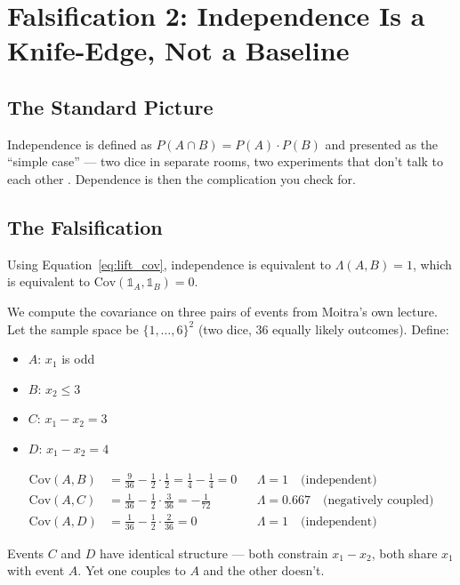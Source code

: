 \documentclass[12pt]{article}
\begin{document}
\section{Falsification 2: Independence Is a Knife-Edge, Not a Baseline}

\subsection{The Standard Picture}

Independence is defined as $P(A \cap B) = P(A) \cdot P(B)$ and presented as the ``simple case'' --- two dice in separate rooms, two experiments that don't talk to each other \cite{moitra2024}. Dependence is then the complication you check for.

\subsection{The Falsification}

Using Equation~\ref{eq:lift_cov}, independence is equivalent to $\Lambda(A,B) = 1$, which is equivalent to $\mathrm{Cov}(\mathbb{1}_A, \mathbb{1}_B) = 0$.

We compute the covariance on three pairs of events from Moitra's own lecture. Let the sample space be $\{1,\ldots,6\}^2$ (two dice, 36 equally likely outcomes). Define:
\begin{itemize}[nosep]
\item $A$: $x_1$ is odd
\item $B$: $x_2 \leq 3$
\item $C$: $x_1 - x_2 = 3$
\item $D$: $x_1 - x_2 = 4$
\end{itemize}

\begin{align}
\mathrm{Cov}(A,B) &= \tfrac{9}{36} - \tfrac{1}{2} \cdot \tfrac{1}{2} = \tfrac{1}{4} - \tfrac{1}{4} = 0 && \Lambda = 1 \quad \text{(independent)} \\[4pt]
\mathrm{Cov}(A,C) &= \frac{1}{36} - \frac{1}{2} \cdot \frac{3}{36} = -\frac{1}{72} && \Lambda = 0.667 \quad \text{(negatively coupled)} \\[4pt]
\mathrm{Cov}(A,D) &= \frac{1}{36} - \frac{1}{2} \cdot \frac{2}{36} = 0 && \Lambda = 1 \quad \text{(independent)}
\end{align}

Events $C$ and $D$ have identical structure --- both constrain $x_1 - x_2$, both share $x_1$ with event $A$. Yet one couples to $A$ and the other doesn't.
\end{document}
